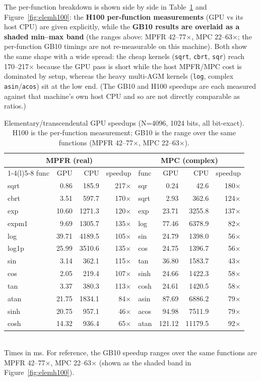 \documentclass[uplatex,dvipdfmx,a4paper,11pt]{jsarticle}
\newcommand{\code}[1]{\texttt{#1}}
\begin{document}
The per-function breakdown is shown side by side in Table~\ref{tab:elemh100} and
Figure~\ref{fig:elemh100}: the \textbf{H100 per-function measurements} (GPU vs its
host CPU) are given explicitly, while the \textbf{GB10 results are overlaid as a
shaded min--max band} (the ranges above: MPFR 42--77$\times$, MPC 22--63$\times$;
the per-function GB10 timings are not re-measurable on this machine). Both show the
same shape with a wide spread: the cheap kernels (\code{sqrt}, \code{cbrt},
\code{sqr}) reach 170--217$\times$ because the GPU pass is short while the host
MPFR/MPC cost is dominated by setup, whereas the heavy multi-AGM kernels
(\code{log}, complex \code{asin}/\code{acos}) sit at the low end. (The GB10 and H100
speedups are each measured against that machine's own host CPU and so are not
directly comparable as ratios.)

\begin{table}[h]
\centering
\caption{Elementary/transcendental GPU speedups (N=4096, 1024 bits, all bit-exact).
H100 is the per-function measurement; GB10 is the range over the same functions
(MPFR 42--77$\times$, MPC 22--63$\times$).}
\label{tab:elemh100}
\footnotesize
\begin{tabular}{lrrr@{\hskip 2em}lrrr}
\toprule
\multicolumn{4}{c}{MPFR (real)} & \multicolumn{4}{c}{MPC (complex)}\\
\cmidrule(r){1-4}\cmidrule(l){5-8}
func & GPU & CPU & speedup & func & GPU & CPU & speedup\\
\midrule
sqrt  & 0.86  & 185.9  & 217$\times$ & sqr  & 0.24  & 42.6    & 180$\times$\\
cbrt  & 3.51  & 597.7  & 170$\times$ & sqrt & 2.93  & 362.6   & 124$\times$\\
exp   & 10.60 & 1271.3 & 120$\times$ & exp  & 23.71 & 3255.8  & 137$\times$\\
expm1 & 9.69  & 1305.7 & 135$\times$ & log  & 77.46 & 6378.9  & 82$\times$\\
log   & 39.71 & 4189.5 & 105$\times$ & sin  & 24.79 & 1398.0  & 56$\times$\\
log1p & 25.99 & 3510.6 & 135$\times$ & cos  & 24.75 & 1396.7  & 56$\times$\\
sin   & 3.14  & 362.1  & 115$\times$ & tan  & 36.80 & 1583.7  & 43$\times$\\
cos   & 2.05  & 219.4  & 107$\times$ & sinh & 24.66 & 1422.3  & 58$\times$\\
tan   & 3.37  & 380.3  & 113$\times$ & cosh & 24.61 & 1420.5  & 58$\times$\\
atan  & 21.75 & 1834.1 & 84$\times$  & asin & 87.69 & 6886.2  & 79$\times$\\
sinh  & 20.75 & 957.1  & 46$\times$  & acos & 94.98 & 7511.9  & 79$\times$\\
cosh  & 14.32 & 936.4  & 65$\times$  & atan & 121.12& 11179.5 & 92$\times$\\
\bottomrule
\end{tabular}\\[2pt]
\footnotesize Times in ms. For reference, the GB10 speedup ranges over the same
functions are MPFR 42--77$\times$, MPC 22--63$\times$ (shown as the shaded band in
Figure~\ref{fig:elemh100}).
\end{table}
\end{document}
